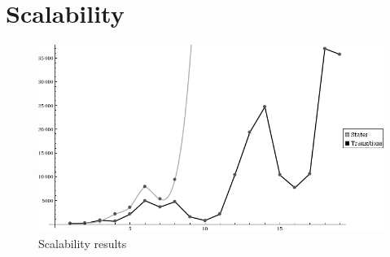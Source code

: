
\section{Scalability}
\label{sec:scalability}

\begin{figure}[htp]
\centering
\includegraphics[scale=0.5]{figures/measurements_scalability}
\caption{Scalability results}
\label{fig:measurements_scalability}
\end{figure}


